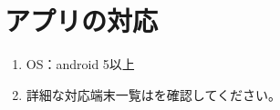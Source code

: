 \section{アプリの対応}
    \begin{enumerate}
        \item OS：android 5以上
        \item 詳細な対応端末一覧はを確認してください。
    \end{enumerate}